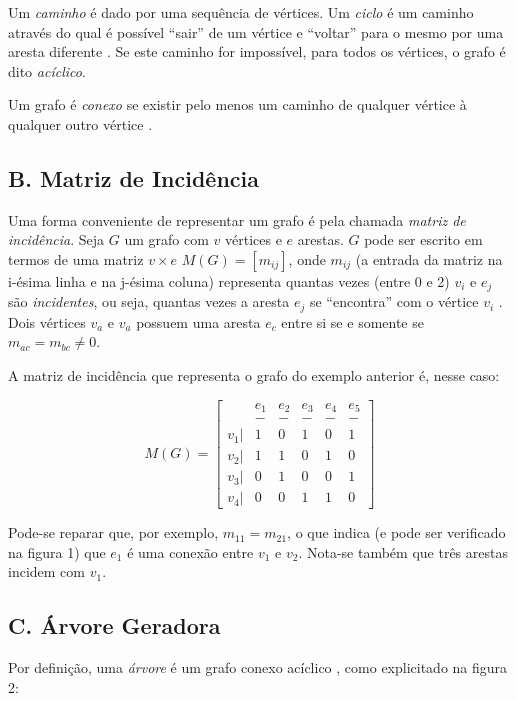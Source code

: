 \documentclass[twocolumn, 10pt]{extarticle}
\begin{document}
Um \textit{caminho} é dado por uma sequência de vértices. Um \textit{ciclo} é um caminho através do qual é possível ``sair'' de um vértice e ``voltar'' para o mesmo por uma aresta diferente \cite[p. 519]{sedgewick}. Se este caminho for impossível, para todos os vértices, o grafo é dito \textit{acíclico}.

Um grafo é \textit{conexo} se existir pelo menos um caminho de qualquer vértice à qualquer outro vértice \cite[p. 519]{sedgewick}.

\subsection*{B. \quad Matriz de Incidência}

Uma forma conveniente de representar um grafo é pela chamada \textit{matriz de incidência}. Seja $G$ um grafo com $v$ vértices e $e$ arestas. $G$ pode ser escrito em termos de uma matriz $v \times e$ $M(G) = [m_{ij}]$, onde $m_{ij}$ (a entrada da matriz na i-ésima linha e na j-ésima coluna) representa quantas vezes (entre 0 e 2) $v_i$ e $e_j$ são \textit{incidentes}, ou seja, quantas vezes a aresta $e_j$ se ``encontra'' com o vértice $v_i$ \cite[p. 7]{bondy}. Dois vértices $v_a$ e $v_a$ possuem uma aresta $e_c$ entre si se e somente se $m_{ac} = m_{bc} \neq 0$.

A matriz de incidência que representa o grafo do exemplo anterior é, nesse caso:

\[
M(G) = 
\begin{bmatrix}
 & e_1 & e_2 & e_3 & e_4 & e_5 \\
 & - & - & - & - & - \\
 v_1 |& 1 & 0 & 1 & 0 & 1\\
 v_2 |& 1 & 1 & 0 & 1 & 0\\
 v_3 |& 0 & 1 & 0 & 0 & 1\\
 v_4 |& 0 & 0 & 1 & 1 & 0
\end{bmatrix}
\]

Pode-se reparar que, por exemplo, $m_{11} = m_{21}$, o que indica (e pode ser verificado na figura 1) que $e_1$ é uma conexão entre $v_1$ e $v_2$. Nota-se também que três arestas incidem com $v_1$. 


\subsection*{C. \quad Árvore Geradora}

Por definição, uma \textit{árvore} é um grafo conexo acíclico \cite[p. 520]{sedgewick}, como explicitado na figura 2:
\end{document}
